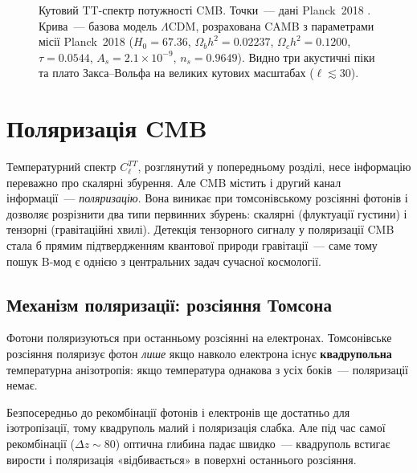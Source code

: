 \documentclass[12pt, a4paper]{article}
\begin{document}
\begin{figure}[t!]
\caption{Кутовий TT-спектр потужності CMB. Точки~--- дані Planck~2018
         \cite{planck_2018}.
         Крива~--- базова модель $\Lambda$CDM, розрахована CAMB
         з параметрами місії Planck~2018 \cite{planck_2018}
         ($H_0=67.36$, $\Omega_b h^2=0.02237$, $\Omega_c h^2=0.1200$,
         $\tau=0.0544$, $A_s=2.1\times10^{-9}$, $n_s=0.9649$).
         Видно три акустичні піки та плато Закса--Вольфа на великих
         кутових масштабах ($\ell \lesssim 30$).}
\label{fig:cmb_tt}
\end{figure}


\section{Поляризація CMB}
\label{sec:pol}

Температурний спектр $C_\ell^{TT}$, розглянутий у попередньому
розділі, несе інформацію переважно про скалярні збурення.
Але CMB містить і другий канал інформації~--- \emph{поляризацію}.
Вона виникає при томсонівському розсіянні фотонів і дозволяє
розрізнити два типи первинних збурень: скалярні (флуктуації
густини) і тензорні (гравітаційні хвилі). Детекція тензорного
сигналу у поляризації CMB стала б прямим підтвердженням
квантової природи гравітації~--- саме тому пошук B-мод є
однією з центральних задач сучасної космології.

\subsection*{Механізм поляризації: розсіяння Томсона}

Фотони поляризуються при останньому розсіянні на електронах.
Томсонівське розсіяння поляризує фотон \emph{лише} якщо навколо електрона
існує \textbf{квадрупольна} температурна анізотропія: якщо температура
однакова з усіх боків~--- поляризації немає.

Безпосередньо до рекомбінації фотонів і електронів ще достатньо для
ізотропізації, тому квадруполь малий і поляризація слабка.
Але під час самої рекомбінації ($\Delta z \sim 80$) оптична глибина
падає швидко~--- квадруполь встигає вирости і поляризація «відбивається»
в поверхні останнього розсіяння.
\end{document}
